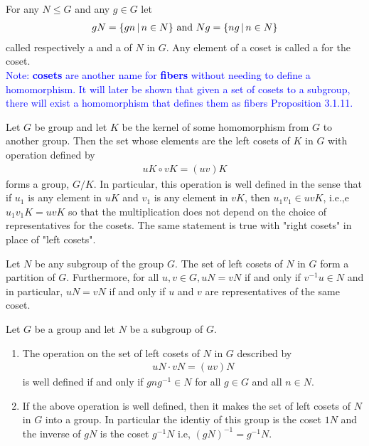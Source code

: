 \documentclass[10pt,a4paper]{report}
\newcommand{\BLUE}[1]{\textcolor{blue}{#1}}
\begin{document}
\begin{definition}[Coset]For any $N \le G$ and any $g \in G$ let
\begin{align*}
	gN=\{gn\,|\, n\in N\}\text{ and } Ng=\{ng\,|\,n \in N\}
\end{align*}called respectively a  and a  of $N$ in $G$.  Any element of a coset is called a  for the coset. \\
\BLUE{Note: \textbf{cosets} are another name for \textbf{fibers} without needing to define a homomorphism.  It will later be shown that given a set of cosets to a subgroup, there will exist a homomorphism that defines them as fibers Proposition 3.1.11.}
\end{definition}

\begin{theorem}
Let $G$ be group and let $K$ be the kernel of some homomorphism from $G$ to another group.  Then the set whose elements are the left cosets of $K$ in $G$ with operation defined by
\begin{align*}
	uK \circ vK=(uv)K
\end{align*}forms a group, $G/K$.  In particular, this operation is well defined in the sense that if $u_1$ is any element in $uK$ and $v_1$ is any element in $vK$, then $u_1v_1 \in uvK$, i.e.,e $u_1v_1K = uvK$ so that the multiplication does not depend on the choice of representatives for the cosets.  The same statement is true with "right cosets" in place of "left cosets".
\end{theorem}

\begin{prop} Let $N$ be any subgroup of the group $G$.  The set of left cosets of $N$ in $G$ form a partition of $G$.  Furthermore, for all $u,v \in G, uN=vN$ if and only if $v^{-1}u\in N$ and in particular, $uN=vN$ if and only if $u$ and $v$ are representatives of the same coset.
\end{prop}

\begin{prop} Let $G$ be a group and let $N$ be a subgroup of $G$.
\begin{enumerate}
	\item The operation on the set of left cosets of $N$ in $G$ described by
	\begin{align*}
		uN\cdot vN=(uv)N
	\end{align*}is well defined if and only if $gng^{-1}\in N$ for all $g \in G$ and all $n \in N$.
	\item If the above operation is well defined, then it makes the set of left cosets of $N$ in $G$ into a group.  In particular the identiy of this group is the coset $1N$ and the inverse of $gN$ is the coset $g^{-1}N$ i.e, $(gN)^{-1}=g^{-1}N$.
\end{enumerate}
\end{prop}
\end{document}
